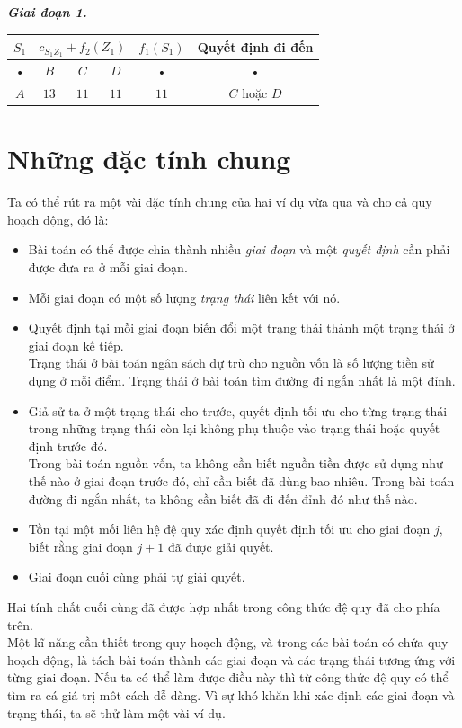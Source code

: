 \documentclass[12pt,a4paper]{article}
\begin{document}
\textbf{\textit{Giai đoạn 1.}}
\begin{center}
\begin{table}[H]
\begin{tabular}{|c|c|c|c|c|c|}
\hline 
\(S_1\) & \multicolumn{3}{c|}{\({c_{{S_1}{Z_1}}} + {f_2}\left( {{Z_1}} \right)\)} & \({f_1}\left( {{S_1}} \right)\) & Quyết định đi đến \\ 
\hline 
• & \(B\) & \(C\) & \(D\) & • & • \\ 
\hline 
\(A\) & \(13\) & \(11\) & \(11\) & \(11\) & \(C\) hoặc \(D\) \\ 
\hline 
\end{tabular} 
\end{table}
\end{center}
\section{Những đặc tính chung}
Ta có thể rút ra một vài đặc tính chung của hai ví dụ vừa qua và cho cả quy hoạch động, đó là:
\begin{itemize}
\item Bài toán có thể được chia thành nhiều \textit{giai đoạn} và một \textit{quyết định} cần phải được đưa ra ở mỗi giai đoạn.
\item Mỗi giai đoạn có một số lượng \textit{trạng thái} liên kết với nó.
\item Quyết định tại mỗi giai đoạn biến đổi một trạng thái thành một trạng thái ở giai đoạn kế tiếp.\\
Trạng thái ở bài toán ngân sách dự trù cho nguồn vốn là số lượng tiền sử dụng ở mỗi điểm. Trạng thái ở bài toán tìm đường đi ngắn nhất là một đỉnh.
\item Giả sử ta ở một trạng thái cho trước, quyết định tối ưu cho từng trạng thái trong những trạng thái còn lại không phụ thuộc vào trạng thái hoặc quyết định trước đó.\\
Trong bài toán nguồn vốn, ta không cần biết nguồn tiền được sử dụng như thế nào ở giai đoạn trước đó, chỉ cần biết đã dùng bao nhiêu. Trong bài toán đường đi ngắn nhất, ta không cần biết đã đi đến đỉnh đó như thế nào.
\item Tồn tại một mối liên hệ đệ quy xác định quyết định tối ưu cho giai đoạn \(j,\) biết rằng giai đoạn \(j + 1\) đã được giải quyết.
\item Giai đoạn cuối cùng phải tự giải quyết.
\end{itemize}
Hai tính chất cuối cùng đã được hợp nhất trong công thức đệ quy đã cho phía trên.\\
Một kĩ năng cần thiết trong quy hoạch động, và trong các bài toán có chứa quy hoạch động, là tách bài toán thành các giai đoạn và các trạng thái tương ứng với từng giai đoạn. Nếu ta có thể làm được điều này thì từ công thức đệ quy có thể tìm ra cá giá trị môt cách dễ dàng. Vì sự khó khăn khi xác định các giai đoạn và trạng thái, ta sẽ thử làm một vài ví dụ.
\end{document}
